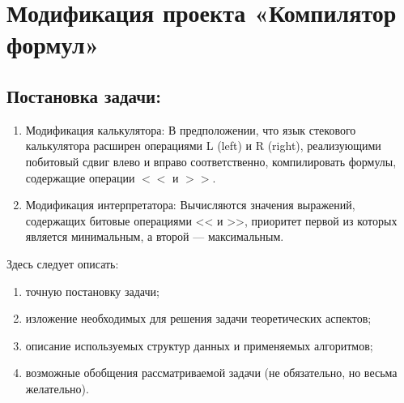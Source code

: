 \section{Модификация проекта «Компилятор формул»}

\subsection{Постановка задачи:}
\begin{enumerate}
\item Модификация калькулятора:
В предположении, что язык стекового калькулятора
расширен операциями L (left) и R (right),
реализующими побитовый сдвиг влево и вправо соответственно, компилировать
формулы, содержащие операции $<<$ и $>>$.
\item Модификация интерпретатора:
Вычисляются значения выражений, содержащих битовые операциями << и >>,
приоритет первой из которых является минимальным, а второй — максимальным.
\end{enumerate}

Здесь следует описать:
\begin{enumerate}[1)]
\item точную постановку задачи;
\item изложение необходимых для решения задачи теоретических аспектов;
\item описание используемых структур данных и применяемых алгоритмов;
\item возможные обобщения рассматриваемой задачи (не обязательно, но
      весьма желательно).
\end{enumerate}
